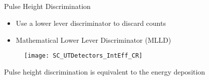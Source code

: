 \subsection*{}
\begin{frame}[t]{Pulse Height Discrimination}
\label{PHDMain}
  \begin{itemize}
    \item Use a lower lever discriminator to discard counts
    \item Mathematical Lower Lever Discriminator (MLLD)
  \end{itemize}
  \begin{figure}
      \texttt{[image: SC\_UTDetectors\_IntEff\_CR]}
  \end{figure}
  Pulse height discrimination is equivalent to the energy deposition
\hyperlink{MeasMethods}{}
\end{frame}

